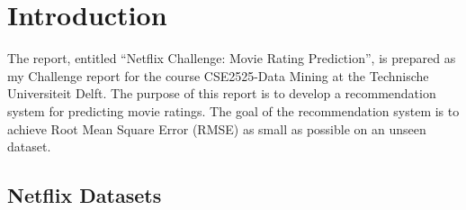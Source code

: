 \documentclass{ece}
\begin{document}
\body

\section{Introduction}

The report, entitled ``Netflix Challenge: Movie Rating Prediction'', is prepared as my Challenge report for the course CSE2525-Data Mining at the Technische Universiteit Delft.
The purpose of this report is to develop a recommendation system for predicting movie ratings.
The goal of the recommendation system is to achieve Root Mean Square Error (RMSE) as small as possible on an unseen dataset.

\subsection{Netflix Datasets}
\end{document}
